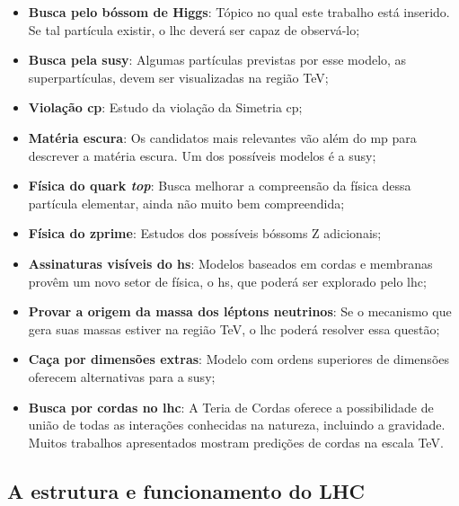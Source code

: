 \begin{itemize}
\item \textbf{Busca pelo bóssom de Higgs}: Tópico no qual este trabalho está
inserido. Se tal partícula existir, o \gls{lhc} deverá ser capaz de observá-lo;
\item \textbf{Busca pela \gls{susy}}: Algumas partículas previstas por esse
modelo, as superpartículas, 
devem ser visualizadas na região TeV;
\item \textbf{Violação \gls{cp}}: Estudo da violação da Simetria \gls{cp};
\item \textbf{Matéria escura}: Os candidatos mais relevantes vão além do \gls{mp}
para descrever a matéria escura. Um dos possíveis modelos é a \gls{susy};
\item \textbf{Física do quark \emph{top}}: Busca melhorar a compreensão da física dessa
partícula elementar, ainda não muito bem compreendida;
\item \textbf{Física do \gls{zprime}}: Estudos dos possíveis bóssoms Z adicionais; 
\item \textbf{Assinaturas visíveis do \gls{hs}}: Modelos baseados em
cordas e membranas provêm um novo setor de física, o \gls{hs}, que poderá ser
explorado pelo \gls{lhc};
\item \textbf{Provar a origem da massa dos léptons neutrinos}: Se o mecanismo que gera
suas massas estiver na região TeV, o \gls{lhc} poderá resolver essa questão;
\item \textbf{Caça por dimensões extras}: Modelo com ordens superiores de dimensões
oferecem alternativas para a \gls{susy};
\item \textbf{Busca por cordas no \gls{lhc}}: A Teria de Cordas oferece a possibilidade de
união de todas as interações conhecidas na natureza, incluindo a gravidade. Muitos
trabalhos apresentados mostram predições de cordas na escala TeV.
\end{itemize}

\subsection{A estrutura e funcionamento do LHC}
\label{ssec:struct_lhc}


